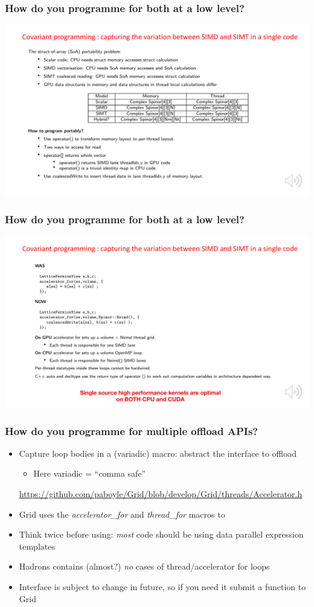 \documentclass[pdf,ps,8pt]{beamer}
\newcommand{\link}[1]{\href{#1}{ {\color{blue} #1} }}
\begin{document}
\begin{frame}[fragile]\small\frametitle{ How do you programme for both at a low level?}
\includegraphics[width=\textwidth]{SIMD_SIMT.pdf}
\end{frame}
\begin{frame}[fragile]\small\frametitle{ How do you programme for both at a low level?}
\includegraphics[width=\textwidth]{SIMD_SIMT_2.pdf}
\end{frame}

\begin{frame}[fragile]\small\frametitle{ How do you programme for multiple offload APIs?}
  \begin{itemize}
  \item Capture loop bodies in a (variadic) macro: abstract the interface to offload
  \begin{itemize}
    \item Here variadic = ``comma safe''
  \end{itemize}
  \link{https://github.com/paboyle/Grid/blob/develop/Grid/threads/Accelerator.h}
  \item Grid uses the \emph{accelerator\_for} and \emph{thread\_for} macros to 
  \item Think twice before using: \emph{most} code should be using data parallel expression templates
  \item Hadrons contains (almost?) \emph{no} cases of thread/accelerator for loops
  \item Interface is subject to change in future, so if you need it submit a function to Grid
  \end{itemize}
\end{frame}
\end{document}
